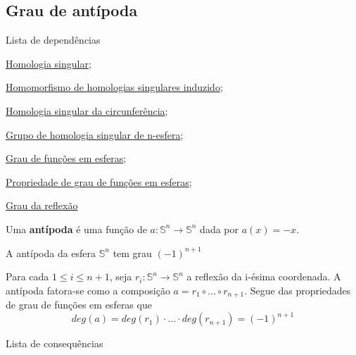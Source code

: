\subsection{Grau de antípoda} %
\label{grau-de-antipoda-prop}
\begin{titlemize}{Lista de dependências}
    \item \hyperref[homologia-singular-def]{Homologia singular};\\
    \item \hyperref[homomorfismo-de-homologias-singulares-induzido-prop]{Homomorfismo de homologias singulares induzido};\\
    \item \hyperref[homologia-singular-de-S1-prop]{Homologia singular da circunferência};\\
    \item \hyperref[grupo-de-homologia-singular-de-n-esfera-prop]{Grupo de homologia singular de n-esfera};\\
    \item \hyperref[grau-de-funcoes-em-esferas-def]{Grau de funções em esferas};\\
    \item \hyperref[propriedades-de-grau-de-funções-prop]{Propriedade de grau de funções em esferas};\\
    \item \hyperref[grau-da-reflexao-prop]{Grau da reflexão}
\end{titlemize}

\begin{defi}
    Uma \textbf{antípoda} é uma função de $a:\mathbb{S}^n\rightarrow \mathbb{S}^n$ dada por $a(x)=-x$.
\end{defi}

\begin{lemma}
    A antípoda da esfera $\mathbb{S}^n$ tem grau $(-1)^{n+1}$
\end{lemma}

\begin{dem}
    Para cada $1\le i\le n+1$, seja $r_i: \mathbb{S}^n\rightarrow \mathbb{S}^n$ a reflexão da i-ésima coordenada. A antípoda fatora-se como a composição $a=r_1\circ ...\circ r_{n+1}$. Segue das propriedades de grau de funções em esferas que 
    \[deg(a)=deg(r_1)\cdot...\cdot deg(r_{n+1})=(-1)^{n+1}\]
\end{dem}

\begin{titlemize}{Lista de consequências}
    \item %
\end{titlemize}
